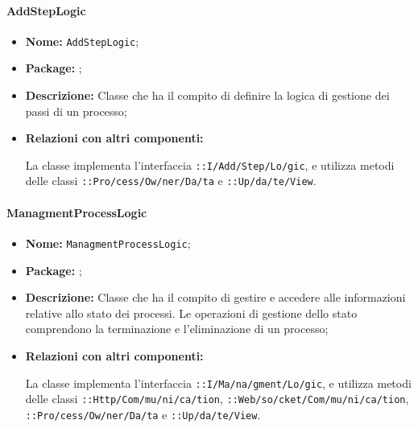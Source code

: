 \paragraph{AddStepLogic}
\begin{flushleft}
\begin{itemize}
\item \textbf{Nome:} \texttt{AddStepLogic};
\item \textbf{Package:} \texttt{\logicAdmin{}};
\item \textbf{Descrizione:} Classe che ha il compito di definire la logica di gestione dei passi di un processo;
\item \textbf{Relazioni con altri componenti:}
\begin{sloppypar}
La classe implementa l'interfaccia \texttt{\iLogicAdmin{}::I\fshyp{}Add\fshyp{}Step\fshyp{}Lo\fshyp{}gic}, e utilizza metodi delle classi \texttt{\model{}::Pro\fshyp{}cess\fshyp{}Ow\fshyp{}ner\fshyp{}Da\fshyp{}ta} e \texttt{\viewAdmin{}::Up\fshyp{}da\fshyp{}te\fshyp{}View}.
\end{sloppypar}
\end{itemize}
\end{flushleft}

\paragraph{ManagmentProcessLogic}
\begin{flushleft}
\begin{itemize}
\item \textbf{Nome:} \texttt{ManagmentProcessLogic};
\item \textbf{Package:} \texttt{\logicAdmin{}};
\item \textbf{Descrizione:} Classe che ha il compito di gestire e accedere alle informazioni relative allo stato dei processi. Le operazioni di gestione dello stato comprendono la terminazione e l'eliminazione di un processo;
\item \textbf{Relazioni con altri componenti:}
\begin{sloppypar}
La classe implementa l'interfaccia \texttt{\iLogicAdmin{}::I\fshyp{}Ma\fshyp{}na\fshyp{}gment\fshyp{}Lo\fshyp{}gic}, e utilizza metodi delle classi \texttt{\serverCommunication{}::Http\fshyp{}Com\fshyp{}mu\fshyp{}ni\fshyp{}ca\fshyp{}tion}, \texttt{\serverCommunication{}::Web\fshyp{}so\fshyp{}cket\fshyp{}Com\fshyp{}mu\fshyp{}ni\fshyp{}ca\fshyp{}tion}, \texttt{\modelAdmin{}::Pro\fshyp{}cess\fshyp{}Ow\fshyp{}ner\fshyp{}Da\fshyp{}ta} e \texttt{\viewAdmin{}::Up\fshyp{}da\fshyp{}te\fshyp{}View}.
\end{sloppypar}
\end{itemize}
\end{flushleft}

